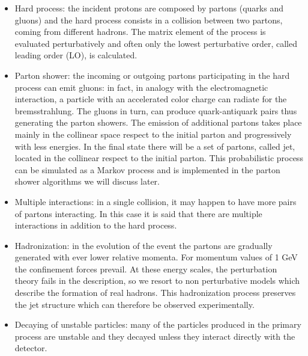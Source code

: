 \begin{itemize}

\item Hard process: the incident protons are composed by  partons (quarks and gluons) and the hard process consists in a collision between two partons, coming from different hadrons. The  matrix element of the process is evaluated perturbatively and often only the lowest perturbative order, called leading order (LO), is calculated.
\item Parton shower: the incoming or outgoing partons participating in the hard process can emit gluons: in fact, in analogy with the electromagnetic interaction, a particle with an accelerated color charge can radiate for the bremsstrahlung.
The gluons in turn, can produce quark-antiquark pairs thus generating the parton showers.
The emission of additional partons takes place mainly in the collinear space respect to the initial parton and  progressively with less energies.
In the final state there will be a set of partons, called jet, located in the collinear respect to the initial parton.
This probabilistic process can be simulated as a Markov process and is implemented in the parton shower algorithms we will discuss later.

\item Multiple interactions: in a single collision, it may happen to have more pairs of partons interacting. In this case it is said that there are multiple interactions in addition to the hard process.

\item Hadronization: in the evolution of the event the partons are gradually generated with ever lower relative momenta. 
For momentum values of 1 GeV the confinement forces prevail. At these energy scales, the perturbation theory fails in the description, so we resort to non perturbative models which describe the formation of real hadrons. This hadronization process  preserves the jet structure which can therefore be observed experimentally.

\item Decaying of unstable particles: many of the particles produced in the primary process are unstable and they  decayed unless they interact directly with the detector.

\end{itemize}


